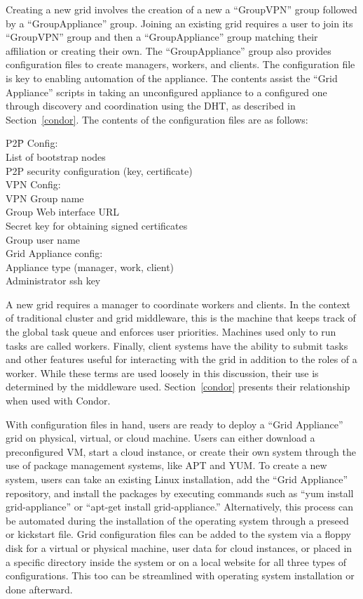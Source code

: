 \documentclass[conference]{IEEEtran}
\begin{document}
Creating a new grid involves the creation of a new a ``GroupVPN'' group
followed by a ``GroupAppliance'' group.  Joining an existing grid requires a
user to join its ``GroupVPN'' group and then a ``GroupAppliance'' group
matching their affiliation or creating their own.  The ``GroupAppliance'' group
also provides configuration files to create managers, workers, and clients.
The configuration file is key to enabling automation of the appliance.  The
contents assist the ``Grid Appliance'' scripts in taking an unconfigured
appliance to a configured one through discovery and coordination using the DHT,
as described in Section~\ref{condor}.  The contents of the configuration files
are as follows:

\begin{tabbing}
P2\=P Config:\\
\> List of bootstrap nodes\\
\> P2P security configuration (key, certificate)\\
VPN Config:\\
\> VPN Group name\\
\> Group Web interface URL\\
\> Secret key for obtaining signed certificates\\
\> Group user name\\
Grid Appliance config:\\
\> Appliance type (manager, work, client)\\
\> Administrator ssh key\\
\end{tabbing}

A new grid requires a manager to coordinate workers and clients.  In the
context of traditional cluster and grid middleware, this is the machine that
keeps track of the global task queue and enforces user priorities.  Machines
used only to run tasks are called workers.  Finally, client systems have the
ability to submit tasks and other features useful for interacting with the grid
in addition to the roles of a worker.  While these terms are used loosely in
this discussion, their use is determined by the middleware used.
Section~\ref{condor} presents their relationship when used with Condor.

With configuration files in hand, users are ready to deploy a ``Grid
Appliance'' grid on physical, virtual, or cloud machine.  Users can either
download a preconfigured VM, start a cloud instance, or create their own system
through the use of package management systems, like APT and YUM.  To create a
new system, users can take an existing Linux installation, add the ``Grid
Appliance'' repository, and install the packages by executing commands such as
``yum install grid-appliance'' or ``apt-get install grid-appliance.''
Alternatively, this process can be automated during the installation of the
operating system through a preseed or kickstart file.  Grid configuration files
can be added to the system via a floppy disk for a virtual or physical machine,
user data for cloud instances, or placed in a specific directory inside the
system or on a local website for all three types of configurations.  This too
can be streamlined with operating system installation or done afterward.  
 
\end{document}
